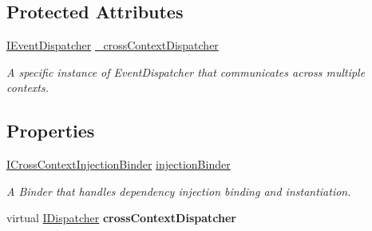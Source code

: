 \subsection*{Protected Attributes}
\begin{DoxyCompactItemize}
\item 
\hyperlink{interfacestrange_1_1extensions_1_1dispatcher_1_1eventdispatcher_1_1api_1_1_i_event_dispatcher}{I\-Event\-Dispatcher} \hyperlink{classstrange_1_1extensions_1_1context_1_1impl_1_1_cross_context_a00c68512ad80d15236954614f223820e}{\-\_\-cross\-Context\-Dispatcher}
\begin{DoxyCompactList}\small\item\em A specific instance of Event\-Dispatcher that communicates across multiple contexts. \end{DoxyCompactList}\end{DoxyCompactItemize}
\subsection*{Properties}
\begin{DoxyCompactItemize}
\item 
\hypertarget{classstrange_1_1extensions_1_1context_1_1impl_1_1_cross_context_aa9e5959a8c384f30821f024a6342da1d}{\hyperlink{interfacestrange_1_1extensions_1_1injector_1_1api_1_1_i_cross_context_injection_binder}{I\-Cross\-Context\-Injection\-Binder} \hyperlink{classstrange_1_1extensions_1_1context_1_1impl_1_1_cross_context_aa9e5959a8c384f30821f024a6342da1d}{injection\-Binder}}\label{classstrange_1_1extensions_1_1context_1_1impl_1_1_cross_context_aa9e5959a8c384f30821f024a6342da1d}

\begin{DoxyCompactList}\small\item\em A Binder that handles dependency injection binding and instantiation. \end{DoxyCompactList}\item 
\hypertarget{classstrange_1_1extensions_1_1context_1_1impl_1_1_cross_context_aa020f2f7a4dbc95dd6df440197d0349e}{virtual \hyperlink{interfacestrange_1_1extensions_1_1dispatcher_1_1api_1_1_i_dispatcher}{I\-Dispatcher} {\bfseries cross\-Context\-Dispatcher}}\label{classstrange_1_1extensions_1_1context_1_1impl_1_1_cross_context_aa020f2f7a4dbc95dd6df440197d0349e}

\end{DoxyCompactItemize}
